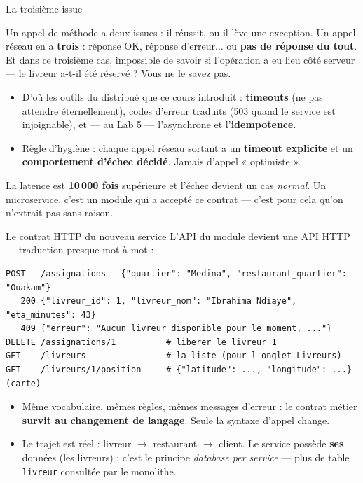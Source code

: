 \documentclass[aspectratio=169,11pt]{beamer}
\begin{document}
\begin{frame}{La troisième issue}
\begin{ucadpiege}
{\small Un appel de méthode a deux issues : il réussit, ou il lève une exception. Un appel réseau en a \textbf{trois} : réponse OK, réponse d'erreur... ou \textbf{pas de réponse du tout}. Et dans ce troisième cas, impossible de savoir si l'opération a eu lieu côté serveur — le livreur a-t-il été réservé ? Vous ne le savez pas.}
\end{ucadpiege}
\begin{itemize}\small
  \item D'où les outils du distribué que ce cours introduit : \textbf{timeouts} (ne pas attendre éternellement), codes d'erreur traduits (503 quand le service est injoignable), et — au Lab 5 — l'asynchrone et l'\textbf{idempotence}.
  \item Règle d'hygiène : chaque appel réseau sortant a un \textbf{timeout explicite} et un \textbf{comportement d'échec décidé}. Jamais d'appel « optimiste ».
\end{itemize}
\begin{ucadret}[À retenir]
{\small La latence est \textbf{10\,000 fois} supérieure et l'échec devient un cas \emph{normal}. Un microservice, c'est un module qui a accepté ce contrat — c'est pour cela qu'on n'extrait pas sans raison.}
\end{ucadret}
\end{frame}

\begin{frame}[fragile]{Le contrat HTTP du nouveau service}
{\small L'API du module devient une API HTTP — traduction presque mot à mot :}
\begin{lstlisting}
POST   /assignations   {"quartier": "Medina", "restaurant_quartier": "Ouakam"}
   200 {"livreur_id": 1, "livreur_nom": "Ibrahima Ndiaye", "eta_minutes": 43}
   409 {"erreur": "Aucun livreur disponible pour le moment, ..."}
DELETE /assignations/1          # liberer le livreur 1
GET    /livreurs                # la liste (pour l'onglet Livreurs)
GET    /livreurs/1/position     # {"latitude": ..., "longitude": ...}  (carte)
\end{lstlisting}
\begin{itemize}\small
  \item Même vocabulaire, mêmes règles, mêmes messages d'erreur : le contrat métier \textbf{survit au changement de langage}. Seule la syntaxe d'appel change.
  \item Le trajet est réel : livreur $\to$ restaurant $\to$ client. Le service possède \textbf{ses} données (les livreurs) : c'est le principe \emph{database per service} — plus de table \texttt{livreur} consultée par le monolithe.
\end{itemize}
\end{frame}
\end{document}
